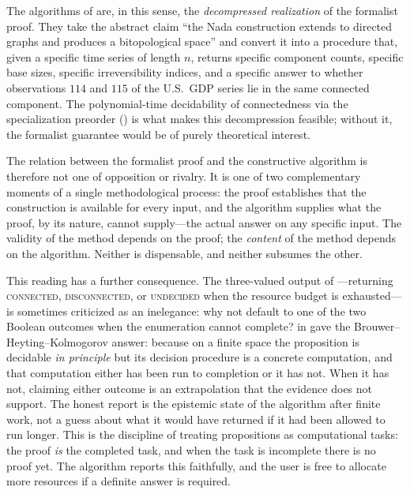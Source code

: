 \documentclass[11pt,a4paper]{article}
\theoremstyle{plain}
\theoremstyle{definition}
\begin{document}
The algorithms of  are, in this sense, the
\emph{decompressed realization} of the formalist proof. They take the
abstract claim ``the Nada construction extends to directed graphs and
produces a bitopological space'' and convert it into a procedure that,
given a specific time series of length $n$, returns specific component
counts, specific base sizes, specific irreversibility indices, and a
specific answer to whether observations $114$ and $115$ of the U.S.\
GDP series lie in the same connected component. The polynomial-time
decidability of connectedness via the specialization preorder
() is what makes this decompression feasible;
without it, the formalist guarantee would be of purely theoretical
interest.

The relation between the formalist proof and the constructive algorithm
is therefore not one of opposition or rivalry. It is one of two
complementary moments of a single methodological process: the proof
establishes that the construction is available for every input, and the
algorithm supplies what the proof, by its nature, cannot supply---the
actual answer on any specific input. The validity of the method
depends on the proof; the \emph{content} of the method depends on the
algorithm. Neither is dispensable, and neither subsumes the other.

This reading has a further consequence. The three-valued output of
\Cref{alg:pairwise}---returning \textsc{connected},
\textsc{disconnected}, or \textsc{undecided} when the resource budget is
exhausted---is sometimes criticized as an inelegance: why not default
to one of the two Boolean outcomes when the enumeration cannot complete?
\Cref{subsec:pairwise-algorithm} in \Cref{sec:algorithms} gave the
Brouwer--Heyting--Kolmogorov answer: because on a finite space the
proposition is decidable \emph{in principle} but its decision
procedure is a concrete computation, and that computation either has
been run to completion or it has not. When it has not, claiming either
outcome is an extrapolation that the evidence does not support. The
honest report is the epistemic state of the algorithm after finite
work, not a guess about what it would have returned if it had been
allowed to run longer. This is the discipline of treating propositions
as computational tasks: the proof \emph{is} the completed task, and
when the task is incomplete there is no proof yet. The algorithm
reports this faithfully, and the user is free to allocate more
resources if a definite answer is required.
\end{document}
